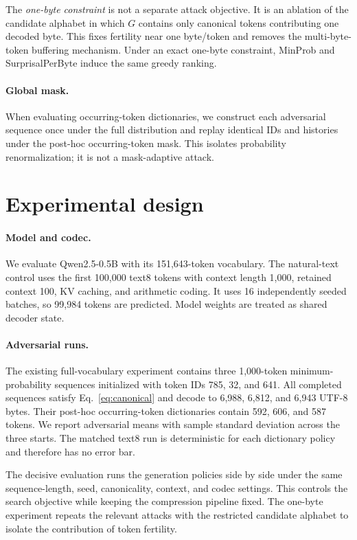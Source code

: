 \documentclass{article}
\begin{document}
The \emph{one-byte constraint} is not a separate attack objective. It is an ablation
of the candidate alphabet in which $G$ contains only canonical tokens contributing
one decoded byte. This fixes fertility near one byte/token and removes the
multi-byte-token buffering mechanism. Under an exact one-byte constraint,
MinProb and SurprisalPerByte induce the same greedy ranking.

\paragraph{Global mask.}
When evaluating occurring-token dictionaries, we construct each adversarial
sequence once under the full distribution and replay identical IDs and histories
under the post-hoc occurring-token mask. This isolates probability renormalization;
it is not a mask-adaptive attack.

\section{Experimental design}
\label{sec:design}

\paragraph{Model and codec.}
We evaluate Qwen2.5-0.5B with its 151,643-token vocabulary. The natural-text control
uses the first 100,000 text8 tokens with context length 1,000, retained context 100,
KV caching, and arithmetic coding. It uses 16 independently seeded batches, so
99,984 tokens are predicted. Model weights are treated as shared decoder state.

\paragraph{Adversarial runs.}
The existing full-vocabulary experiment contains three 1,000-token minimum-
probability sequences initialized with token IDs 785, 32, and 641. All completed
sequences satisfy Eq.~\ref{eq:canonical} and decode to 6,988, 6,812, and 6,943 UTF-8
bytes. Their post-hoc occurring-token dictionaries contain 592, 606, and 587 tokens.
We report adversarial means with sample standard deviation across the three starts.
The matched text8 run is deterministic for each dictionary policy and therefore has
no error bar.

The decisive evaluation runs the generation policies side by side under the same
sequence-length, seed, canonicality, context, and codec settings. This controls the
search objective while keeping the compression pipeline fixed. The one-byte
experiment repeats the relevant attacks with the restricted candidate alphabet to
isolate the contribution of token fertility.
\end{document}
